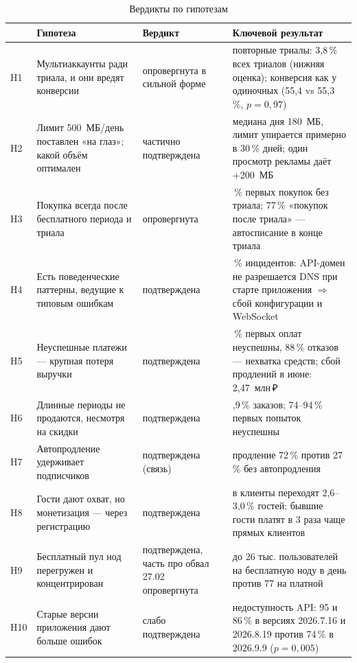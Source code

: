 \documentclass[11pt,a4paper]{article}
\begin{document}
\begin{table}[H]
\centering\small
\caption{Вердикты по гипотезам}\label{tab:summary}
\begin{tabularx}{\linewidth}{@{}l>{\raggedright\arraybackslash}X>{\raggedright\arraybackslash}p{3.0cm}>{\raggedright\arraybackslash}X@{}}
\toprule
& Гипотеза & Вердикт & Ключевой результат \\
\midrule
H1 & Мультиаккаунты ради триала, и они вредят конверсии & опровергнута в сильной форме & повторные триалы: 3,8\,\% всех триалов (нижняя оценка); конверсия как у одиночных (55,4 vs 55,3\,\%, $p=0{,}97$) \\
H2 & Лимит 500~МБ/день поставлен «на глаз»; какой объём оптимален & частично подтверждена & медиана дня 180~МБ, лимит упирается примерно в 30\,\% дней; один просмотр рекламы даёт +200~МБ \\
H3 & Покупка всегда после бесплатного периода и триала & опровергнута & 36\,\% первых покупок без триала; 77\,\% «покупок после триала» --- автосписание в конце триала \\
H4 & Есть поведенческие паттерны, ведущие к типовым ошибкам & подтверждена & 74\,\% инцидентов: API-домен не разрешается DNS при старте приложения $\Rightarrow$ сбой конфигурации и WebSocket \\
H5 & Неуспешные платежи --- крупная потеря выручки & подтверждена & 46\,\% первых оплат неуспешны, 88\,\% отказов --- нехватка средств; сбой продлений в июне: 2,47~млн\,₽ \\
H6 & Длинные периоды не продаются, несмотря на скидки & подтверждена & 0,9\,\% заказов; 74--94\,\% первых попыток неуспешны \\
H7 & Автопродление удерживает подписчиков & подтверждена (связь) & продление 72\,\% против 27\,\% без автопродления \\
H8 & Гости дают охват, но монетизация --- через регистрацию & подтверждена & в клиенты переходят 2,6--3,0\,\% гостей; бывшие гости платят в 3 раза чаще прямых клиентов \\
H9 & Бесплатный пул нод перегружен и концентрирован & подтверждена, часть про обвал 27.02 опровергнута & до 26 тыс. пользователей на бесплатную ноду в день против 77 на платной \\
H10 & Старые версии приложения дают больше ошибок & слабо подтверждена & недоступность API: 95 и 86\,\% в версиях 2026.7.16 и 2026.8.19 против 74\,\% в 2026.9.9 ($p=0{,}005$) \\
\bottomrule
\end{tabularx}
\end{table}
\end{document}
